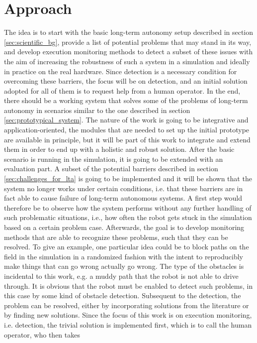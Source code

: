\documentclass[english, master, expose, utf8]{base/thesis_KBS}
\begin{document}
\section{Approach}

The idea is to start with the basic long-term autonomy setup described in section \ref{sec:scientific_bg}, provide a list of potential problems that may 
stand in its way, and develop execution monitoring methods to detect a subset of these issues with the aim of increasing the robustness of such a system in a simulation
and ideally in practice on the real hardware.
Since detection is a necessary condition for overcoming these barriers, the focus will be on detection, and an initial solution adopted for all of them
is to request help from a human operator. In the end, there should be a working system that solves some of the problems of long-term autonomy in scenarios 
similar to the one described in section \ref{sec:prototypical_system}.
The nature of the work is going to be integrative and application-oriented, the modules that are needed to set up the initial prototype are available in principle,
but it will be part of this work to integrate and extend them in order to end up with a holistic and robust solution.
After the basic scenario is running in the simulation, it is going to be extended with an evaluation part. A subset of the potential barriers described in section 
\ref{sec:challenges_for_lta} is going to be implemented and it will be shown that the system no longer works under certain conditions, i.e. that these
barriers are in fact able to cause failure of long-term autonomous systems. A first step would therefore be to observe how the system performs without any further handling 
of such problematic situations, i.e., how often the robot gets stuck in the simulation based on a certain problem case. Afterwards, the goal is to develop monitoring methods 
that are able to recognize these problems, such that they can be resolved. To give an example, one particular idea could be to block paths on the field in the simulation 
in a randomized fashion with the intent to reproducibly make things that can go wrong actually go wrong. The type of the obstacles is incidental to this work, 
e.g. a muddy path that the robot is not able to drive through. It is obvious that the robot must be enabled to detect such problems, in this case by some kind of obstacle detection.
Subsequent to the detection, the problem can be resolved, either by incorporating solutions from the literature or by finding new solutions.
Since the focus of this work is on execution monitoring, i.e. detection, the trivial solution is implemented first, which is to call the human operator, who then takes
\end{document}
